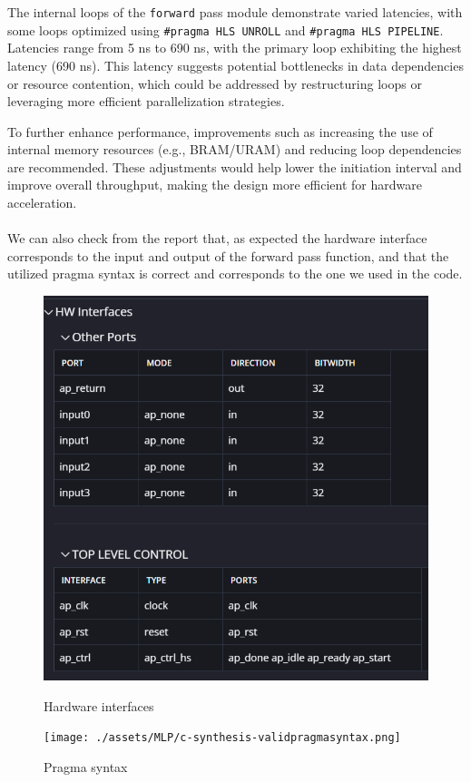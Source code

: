 \documentclass{article}
\begin{document}
The internal loops of the \texttt{forward} pass module demonstrate varied latencies, with some loops optimized using \texttt{\#pragma HLS UNROLL} and \texttt{\#pragma HLS PIPELINE}. Latencies range from 5 ns to 690 ns, with the primary loop exhibiting the highest latency (690 ns). This latency suggests potential bottlenecks in data dependencies or resource contention, which could be addressed by restructuring loops or leveraging more efficient parallelization strategies.

To further enhance performance, improvements such as increasing the use of internal memory resources (e.g., BRAM/URAM) and reducing loop dependencies are recommended. These adjustments would help lower the initiation interval and improve overall throughput, making the design more efficient for hardware acceleration.
\\\\We can also check from the report that, as expected the hardware interface corresponds to the input and output of the forward pass function, and that the utilized pragma syntax is correct and corresponds to the one we used in the code.

\begin{figure}[H]
    \centering
    \begin{minipage}{0.49\textwidth}
        \centering
        \includegraphics[width=1\textwidth]{./assets/MLP/c-synthesis-HWinterfaces.png}
        \caption{Hardware interfaces}
        \label{fig:c-synthesis-hw-interfaces}
    \end{minipage}
    \hfill
    \begin{minipage}{0.49\textwidth}
        \centering
        \texttt{[image: ./assets/MLP/c-synthesis-validpragmasyntax.png]}
        \caption{Pragma syntax}
        \label{fig:c-synthesis-pragma-syntax}
    \end{minipage}
\end{figure}
\end{document}
